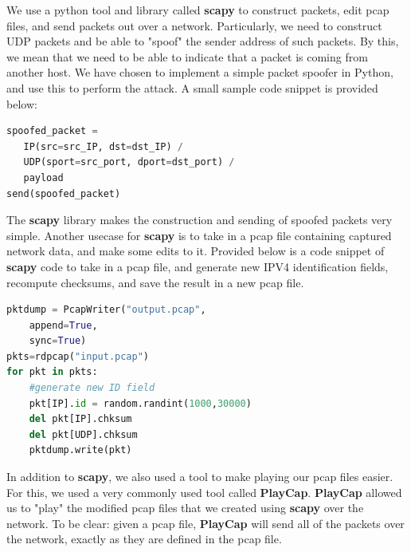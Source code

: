 \documentclass[conference]{IEEEtran}
\begin{document}
We use a python tool and library called \textbf{scapy} to construct packets, edit pcap files, and send packets out over a network. 
Particularly, we  need to construct UDP packets and be able to "spoof" the sender address of such packets.
By this, we mean that we need to be able to indicate that a packet is coming from another host.
We have chosen to implement a simple packet spoofer in Python, and use this to perform the attack.
A small sample code snippet is provided below:
\vspace{0.3cm}
\begin{lstlisting}[language=Python]
spoofed_packet = 
   IP(src=src_IP, dst=dst_IP) / 
   UDP(sport=src_port, dport=dst_port) / 
   payload
send(spoofed_packet)
\end{lstlisting}
\vspace{0.3cm}
The \textbf{scapy} library makes the construction and sending of spoofed packets very simple.
Another usecase for \textbf{scapy} is to take in a pcap file containing captured network data, and make some edits to it.
Provided below is a code snippet of \textbf{scapy} code to take in a pcap file, and generate new IPV4 identification fields, recompute checksums, and save the result in a new pcap file.
\vspace{0.3cm}
\begin{lstlisting}[language=Python]
pktdump = PcapWriter("output.pcap",
	append=True, 
	sync=True)
pkts=rdpcap("input.pcap")
for pkt in pkts:
	#generate new ID field
	pkt[IP].id = random.randint(1000,30000)  
	del pkt[IP].chksum
	del pkt[UDP].chksum
	pktdump.write(pkt)
\end{lstlisting}
\vspace{0.3cm}

In addition to \textbf{scapy}, we also used a tool to make playing our pcap files easier.
For this, we used a very commonly used tool called \textbf{PlayCap}. 
\textbf{PlayCap} allowed us to "play" the modified pcap files that we created using \textbf{scapy} over the network.
To be clear: given a pcap file, \textbf{PlayCap}  will send all of the packets over the network, exactly as they are defined in the pcap file.
\end{document}
